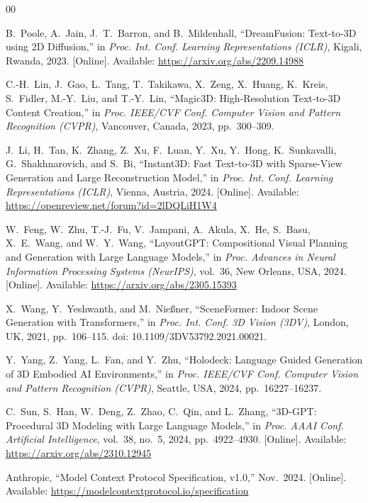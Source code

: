 \documentclass[conference]{IEEEtran}
\begin{document}
\begin{thebibliography}{00}

B.~Poole, A.~Jain, J.~T.~Barron, and B.~Mildenhall, ``DreamFusion: Text-to-3D using 2D Diffusion,'' in \textit{Proc. Int. Conf. Learning Representations (ICLR)}, Kigali, Rwanda, 2023. [Online]. Available: \url{https://arxiv.org/abs/2209.14988}

C.-H.~Lin, J.~Gao, L.~Tang, T.~Takikawa, X.~Zeng, X.~Huang, K.~Kreis, S.~Fidler, M.-Y.~Liu, and T.-Y.~Lin, ``Magic3D: High-Resolution Text-to-3D Content Creation,'' in \textit{Proc. IEEE/CVF Conf. Computer Vision and Pattern Recognition (CVPR)}, Vancouver, Canada, 2023, pp.~300--309.

J.~Li, H.~Tan, K.~Zhang, Z.~Xu, F.~Luan, Y.~Xu, Y.~Hong, K.~Sunkavalli, G.~Shakhnarovich, and S.~Bi, ``Instant3D: Fast Text-to-3D with Sparse-View Generation and Large Reconstruction Model,'' in \textit{Proc. Int. Conf. Learning Representations (ICLR)}, Vienna, Austria, 2024. [Online]. Available: \url{https://openreview.net/forum?id=2lDQLiH1W4}

W.~Feng, W.~Zhu, T.-J.~Fu, V.~Jampani, A.~Akula, X.~He, S.~Basu, X.~E.~Wang, and W.~Y.~Wang, ``LayoutGPT: Compositional Visual Planning and Generation with Large Language Models,'' in \textit{Proc. Advances in Neural Information Processing Systems (NeurIPS)}, vol.~36, New Orleans, USA, 2024. [Online]. Available: \url{https://arxiv.org/abs/2305.15393}

X.~Wang, Y.~Yeshwanth, and M.~Nie{\ss}ner, ``SceneFormer: Indoor Scene Generation with Transformers,'' in \textit{Proc. Int. Conf. 3D Vision (3DV)}, London, UK, 2021, pp.~106--115. doi: 10.1109/3DV53792.2021.00021.

Y.~Yang, Z.~Yang, L.~Fan, and Y.~Zhu, ``Holodeck: Language Guided Generation of 3D Embodied AI Environments,'' in \textit{Proc. IEEE/CVF Conf. Computer Vision and Pattern Recognition (CVPR)}, Seattle, USA, 2024, pp.~16227--16237.

C.~Sun, S.~Han, W.~Deng, Z.~Zhao, C.~Qin, and L.~Zhang, ``3D-GPT: Procedural 3D Modeling with Large Language Models,'' in \textit{Proc. AAAI Conf. Artificial Intelligence}, vol.~38, no.~5, 2024, pp.~4922--4930. [Online]. Available: \url{https://arxiv.org/abs/2310.12945}

Anthropic, ``Model Context Protocol Specification, v1.0,'' Nov.~2024. [Online]. Available: \url{https://modelcontextprotocol.io/specification}


\end{thebibliography}
\end{document}
